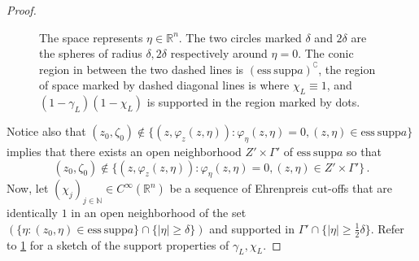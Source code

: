 \documentclass[
	fontsize=11pt, 
	twoside=false, 
	abstract=true, 
	a4paper,
]{scrartcl}
\newcommand{\RR}{\mathbb{R}}
\newcommand{\abs}[1]{\left\lvert#1\right\rvert}
\newcommand{\supp}{\mathrm{supp}}
\newcommand{\es}{\mathrm{ess}\ \mathrm{supp}}
\begin{document}
\begin{proof}
\begin{figure}
	\caption{The space represents $\eta\in \RR^n$. The two circles marked $\delta$ and $2\delta$ are the spheres of radius $\delta, 2\delta$ respectively around $\eta=0$. The conic region in between the two dashed lines is $(\es a)^\complement$, the region of space marked by dashed diagonal lines is where $\chi_L \equiv 1$, and $(1-\gamma_L)(1-\chi_L)$ is supported in the region marked by dots.}
	\label{fig:twocutoffs}
\end{figure}


	Notice also that $(z_0, \zeta_0) \not\in \{ (z, \varphi_z(z,\eta)) \colon \varphi_\eta(z,\eta) = 0, (z,\eta) \in \es a\}$ implies that there exists an open neighborhood $Z'\times\Gamma'$ of $\es a$ so that
	\begin{equation}\label{eq:choosinggammaprime}
		(z_0, \zeta_0) \not\in \{ (z, \varphi_z(z,\eta)) \colon \varphi_\eta(z,\eta) = 0, (z,\eta) \in Z'\times \Gamma'\}\,.
	\end{equation}
	Now, let $(\chi_j)_{j\in\mathbb{N}} \in C^\infty(\RR^n)$ be a sequence of Ehrenpreis cut-offs that are identically $1$ in an open neighborhood of the set $\left(\{\eta \colon (z_0,\eta)\in \es a\} \cap \{\abs{\eta} \geq \delta\}\right)$ and supported in $\Gamma' \cap \{\abs{\eta} \geq \frac{1}{2}\delta\}$. Refer to \cref{fig:twocutoffs} for a sketch of the support properties of $\gamma_L,\chi_L$.




\end{proof}
\end{document}
